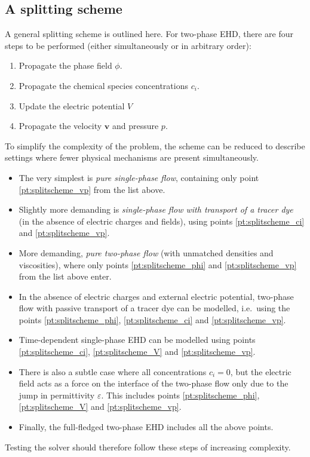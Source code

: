 \documentclass[preprint,pre,superscriptaddress,a4paper]{revtex4-1}
\renewcommand{\v}[1]{\ensuremath{\mathbf{#1}}} %
\begin{document}
\subsection{A splitting scheme}
A general splitting scheme is outlined here.
For two-phase EHD, there are four steps to be performed (either simultaneously or in arbitrary order):
\begin{enumerate}
\item Propagate the phase field $\phi$. \label{pt:splitscheme_phi}
\item Propagate the chemical species concentrations $c_i$. \label{pt:splitscheme_ci}
\item Update the electric potential $V$ \label{pt:splitscheme_V}
\item Propagate the velocity $\v v$ and pressure $p$. \label{pt:splitscheme_vp}
\end{enumerate}
To simplify the complexity of the problem, the scheme can be reduced to describe settings where fewer physical mechanisms are present simultaneously.
\begin{itemize}
\item The very simplest is \emph{pure single-phase flow}, containing only point \ref{pt:splitscheme_vp} from the list above.
\item Slightly more demanding is \emph{single-phase flow with transport of a tracer dye} (in the absence of electric charges and fields), using points \ref{pt:splitscheme_ci} and \ref{pt:splitscheme_vp}.
\item More demanding, \emph{pure two-phase flow} (with unmatched densities and viscosities), where only points \ref{pt:splitscheme_phi} and \ref{pt:splitscheme_vp} from the list above enter.
\item In the absence of electric charges and external electric potential, two-phase flow with passive transport of a tracer dye can be modelled, i.e.~using the points \ref{pt:splitscheme_phi}, \ref{pt:splitscheme_ci} and \ref{pt:splitscheme_vp}.
\item Time-dependent single-phase EHD can be modelled using points \ref{pt:splitscheme_ci}, \ref{pt:splitscheme_V} and \ref{pt:splitscheme_vp}.
\item There is also a subtle case where all concentrations $c_i = 0$, but the electric field acts as a force on the interface of the two-phase flow only due to the jump in permittivity $\varepsilon$.
  This includes points \ref{pt:splitscheme_phi}, \ref{pt:splitscheme_V} and \ref{pt:splitscheme_vp}.
\item Finally, the full-fledged two-phase EHD includes all the above points.
\end{itemize}
Testing the solver should therefore follow these steps of increasing complexity.
\end{document}
